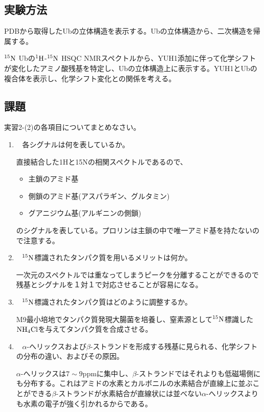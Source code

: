 \documentclass[a4paper,papersize,dvipdfmx]{jsarticle}
\newcommand{\mon}[1]{\item[({#1})] \ }
\begin{document}
\subsection*{実験方法}
PDBから取得したUbの立体構造を表示する。Ubの立体構造から、二次構造を帰属する。

$\rm ^{15}N$ Ubの$\rm ^1H$-$\rm ^{15}N$ HSQC NMRスペクトルから、YUH1添加に伴って化学シフトが変化したアミノ酸残基を特定し、Ubの立体構造上に表示する。YUH1とUbの複合体を表示し、化学シフト変化との関係を考える。

\subsection*{課題}

\begin{tcolorbox}[colback=white,colbacktitle=black!10!white,coltitle=black,title={1}]
実習2-(2)の各項目についてまとめなさい。
\end{tcolorbox}

\begin{enumerate}
\mon{ア} 各シグナルは何を表しているか。

直接結合した1Hと15Nの相関スペクトルであるので、
\begin{itemize}
\item 主鎖のアミド基
\item 側鎖のアミド基(アスパラギン、グルタミン)
\item グアニジウム基(アルギニンの側鎖)
\end{itemize}
のシグナルを表している。プロリンは主鎖の中で唯一アミド基を持たないので注意する。

\mon{イ} $\rm ^{15}N$標識されたタンパク質を用いるメリットは何か。

一次元のスペクトルでは重なってしまうピークを分離することができるので残基とシグナルを１対１で対応させることが容易になる。

\mon{ウ} $\rm ^{15}N$標識されたタンパク質はどのように調整するか。

M9最小培地でタンパク質発現大腸菌を培養し、窒素源として$\rm ^{15}N$標識した$\rm NH_4Cl$を与えてタンパク質を合成させる。

\mon{エ} $\alpha$-へリックスおよび$\beta$-ストランドを形成する残基に見られる、化学シフトの分布の違い、およびその原因。

$\alpha$-へリックスは$7\sim9$ppmに集中し、$\beta$-ストランドではそれよりも低磁場側にも分布する。これはアミドの水素とカルボニルの水素結合が直線上に並ぶことができる$\beta$-ストランドが水素結合が直線状には並べない$\alpha$-へリックスよりも水素の電子が強く引かれるからである。
\end{enumerate}
\end{document}
